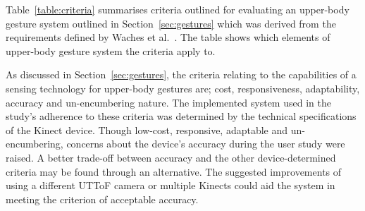 \documentclass[manuscript, review, screen]{acmart}
\begin{document}

Table~\ref{table:criteria} summarises criteria outlined for evaluating an upper-body gesture system outlined in Section~\ref{sec:gestures} which was derived from the requirements defined by Waches et al.~\citeyearpar{Wachs2011}.
The table shows which elements of upper-body gesture system the criteria apply to.

As discussed in Section~\ref{sec:gestures}, the criteria relating to the capabilities of a sensing technology for upper-body gestures are; cost, responsiveness, adaptability, accuracy and un-encumbering nature.
The implemented system used in the study's adherence to these criteria was determined by the technical specifications of the Kinect device.
Though low-cost, responsive, adaptable and un-encumbering, concerns about the device's accuracy during the user study were raised.
A better trade-off between accuracy and the other device-determined criteria may be found through an alternative.
The suggested improvements of using a different \ac{UTToF} camera or multiple Kinects could aid the system in meeting the criterion of acceptable accuracy.
\end{document}
